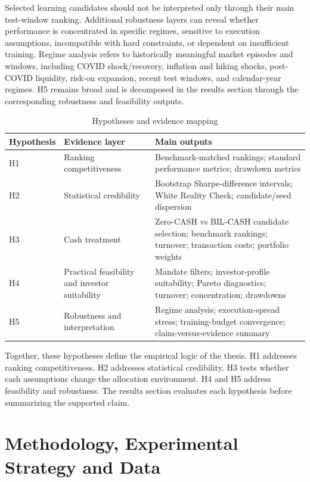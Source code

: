 \documentclass[12pt]{article}
\begin{document}
Selected learning candidates should not be interpreted only through their main test-window ranking. Additional robustness layers can reveal whether performance is concentrated in specific regimes, sensitive to execution assumptions, incompatible with hard constraints, or dependent on insufficient training. Regime analysis refers to historically meaningful market episodes and windows, including COVID shock/recovery, inflation and hiking shocks, post-COVID liquidity, risk-on expansion, recent test windows, and calendar-year regimes. H5 remains broad and is decomposed in the results section through the corresponding robustness and feasibility outputs.

\begin{table}[htbp]
\centering
\caption{Hypotheses and evidence mapping}
\scriptsize
\begin{tabularx}{\textwidth}{L{0.13\textwidth}L{0.29\textwidth}Y}
\toprule
\textbf{Hypothesis} & \textbf{Evidence layer} & \textbf{Main outputs} \\
\midrule
H1 & Ranking competitiveness & Benchmark-matched rankings; standard performance metrics; drawdown metrics \\
H2 & Statistical credibility & Bootstrap Sharpe-difference intervals; White Reality Check; candidate/seed dispersion \\
H3 & Cash treatment & Zero-CASH vs BIL-CASH candidate selection; benchmark rankings; turnover; transaction costs; portfolio weights \\
H4 & Practical feasibility and investor suitability & Mandate filters; investor-profile suitability; Pareto diagnostics; turnover; concentration; drawdowns \\
H5 & Robustness and interpretation & Regime analysis; execution-spread stress; training-budget convergence; claim-versus-evidence summary \\
\bottomrule
\end{tabularx}
\end{table}

Together, these hypotheses define the empirical logic of the thesis. H1 addresses ranking competitiveness. H2 addresses statistical credibility. H3 tests whether cash assumptions change the allocation environment. H4 and H5 address feasibility and robustness. The results section evaluates each hypothesis before summarizing the supported claim.

\newpage

\section{Methodology, Experimental Strategy and Data}
\end{document}
